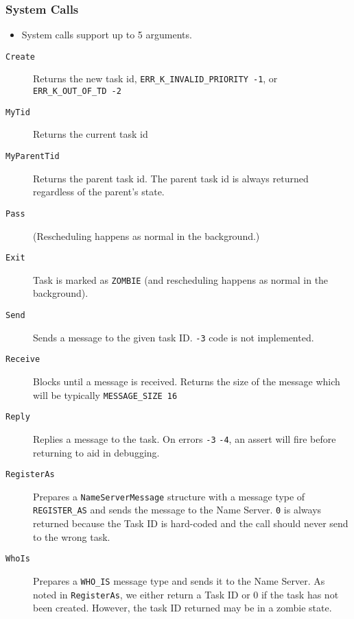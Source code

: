\documentclass[letterpaper]{article}
\begin{document}
\subsubsection{System Calls%
  \label{system-calls}%
}
%
\begin{itemize}

\item System calls support up to 5 arguments.

\end{itemize}
%
\begin{description}
\item[{\texttt{Create}}] \leavevmode 
Returns the new task id, \texttt{ERR\_K\_INVALID\_PRIORITY -1}, or \texttt{ERR\_K\_OUT\_OF\_TD -2}

\item[{\texttt{MyTid}}] \leavevmode 
Returns the current task id

\item[{\texttt{MyParentTid}}] \leavevmode 
Returns the parent task id. The parent task id is always returned regardless of the parent's state.

\item[{\texttt{Pass}}] \leavevmode 
(Rescheduling happens as normal in the background.)

\item[{\texttt{Exit}}] \leavevmode 
Task is marked as \texttt{ZOMBIE} (and rescheduling happens as normal in the background).

\item[{\texttt{Send}}] \leavevmode 
Sends a message to the given task ID. \texttt{-3} code is not implemented.

\item[{\texttt{Receive}}] \leavevmode 
Blocks until a message is received. Returns the size of the message which will be typically \texttt{MESSAGE\_SIZE 16}

\item[{\texttt{Reply}}] \leavevmode 
Replies a message to the task. On errors \texttt{-3} \texttt{-4}, an assert will fire before returning to aid in debugging.

\item[{\texttt{RegisterAs}}] \leavevmode 
Prepares a \texttt{NameServerMessage} structure with a message type of \texttt{REGISTER\_AS} and sends the message to the Name Server. \texttt{0} is always returned because the Task ID is hard-coded and the call should never send to the wrong task.

\item[{\texttt{WhoIs}}] \leavevmode 
Prepares a \texttt{WHO\_IS} message type and sends it to the Name Server. As noted in \texttt{RegisterAs}, we either return a Task ID or 0 if the task has not been created. However, the task ID returned may be in a zombie state.


\end{description}
\end{document}
